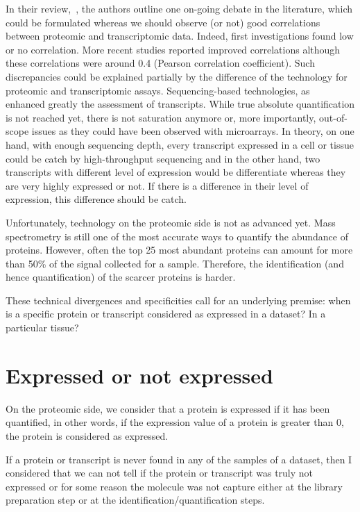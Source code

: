 In their review,~\cite{Uhlen:2016}, the authors outline one on-going debate
in the literature, which could be formulated whereas we should observe (or not) good
correlations between proteomic and transcriptomic data.
Indeed, first investigations found low or no correlation. More recent
studies reported improved correlations although these correlations were around
0.4 (Pearson correlation coefficient). Such discrepancies could be explained
partially by the difference of the technology for proteomic and transcriptomic
assays. Sequencing-based technologies, as \Rnaseq\, enhanced greatly the assessment
of transcripts. While true absolute quantification is not reached yet, there is
not saturation anymore or, more importantly, out-of-scope issues as they could
have been observed with microarrays. In theory, on one hand, with enough
sequencing depth, every transcript expressed in a cell or tissue could be catch
by high-throughput sequencing and in the other hand, two transcripts with different
level of expression would be differentiate whereas they are very highly expressed
or not. If there is a difference in their level of expression, this difference
should be catch.

Unfortunately, technology on the proteomic side is not as advanced yet.
Mass spectrometry is still one of the most accurate ways to quantify the abundance
of proteins. However, often the top 25 most abundant proteins can amount for more
than 50\% of the signal collected for a sample. Therefore, the identification (and
hence quantification) of the scarcer proteins is harder.


These technical divergences and specificities call for an underlying premise:
when is a specific protein or transcript considered as
expressed in a dataset? In a particular tissue?

\section{Expressed or not expressed}\raggedbottom
\label{sec:IntegrationExpressedOrNot}

On the proteomic side, we consider that a protein is expressed if it has been
quantified, in other words, if the expression value of a protein is greater
than 0, the protein is considered as expressed.

If a protein or transcript is never found in any of the samples of a dataset,
then I considered that we can not tell if the protein or transcript was truly not
expressed or for some reason the molecule was not capture either at the library
preparation step or at the identification/quantification steps.



